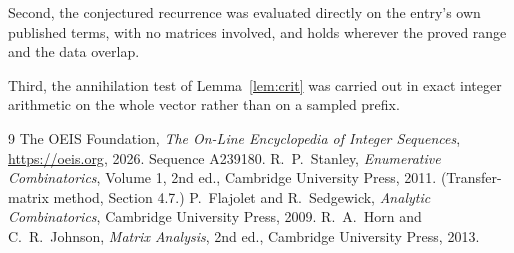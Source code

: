 \documentclass[11pt,a4paper]{article}
\theoremstyle{plain}
\theoremstyle{definition}
\begin{document}
Second, the conjectured recurrence was evaluated directly on the entry's own published terms,
with no matrices involved, and holds wherever the proved range and the data overlap.

Third, the annihilation test of Lemma~\ref{lem:crit} was carried out in exact integer
arithmetic on the whole vector rather than on a sampled prefix.

\begin{thebibliography}{9}
 The OEIS Foundation, \emph{The On-Line Encyclopedia of Integer
Sequences}, \url{https://oeis.org}, 2026. Sequence A239180.
 R.~P.~Stanley, \emph{Enumerative Combinatorics}, Volume 1, 2nd ed.,
Cambridge University Press, 2011. (Transfer-matrix method, Section 4.7.)
 P.~Flajolet and R.~Sedgewick, \emph{Analytic Combinatorics}, Cambridge
University Press, 2009.
 R.~A.~Horn and C.~R.~Johnson, \emph{Matrix Analysis}, 2nd ed., Cambridge
University Press, 2013.
\end{thebibliography}
\end{document}
